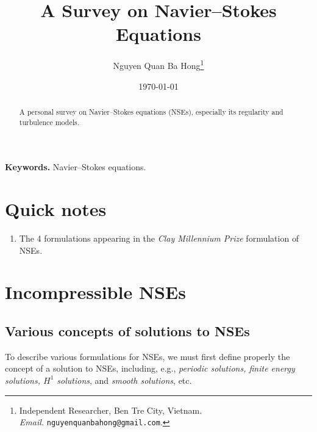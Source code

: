 \documentclass{article}
\title{A Survey on Navier--Stokes Equations}
\author{Nguyen Quan Ba Hong\footnote{Independent Researcher, Ben Tre City, Vietnam.\\\textit{Email.} \texttt{nguyenquanbahong@gmail.com}.}}
\date{\today}
\numberwithin{equation}{section}
\begin{document}
\maketitle

\begin{abstract}
	A personal survey on Navier--Stokes equations (NSEs), especially its regularity and turbulence models.
\end{abstract}
\textbf{Keywords.} Navier--Stokes equations.

\tableofcontents


\section*{Quick notes}
\begin{enumerate}
	\item The 4 formulations appearing in the \textit{Clay Millennium Prize} formulation \cite{Fefferman2006} of NSEs.
\end{enumerate}

\section{Incompressible NSEs}

\subsection{Various concepts of solutions to NSEs}
To describe various formulations for NSEs, we must first define properly the concept of a solution to NSEs, including, e.g., \textit{periodic solutions, finite energy solutions, $H^1$ solutions}, and \textit{smooth solutions}, etc.
\end{document}
